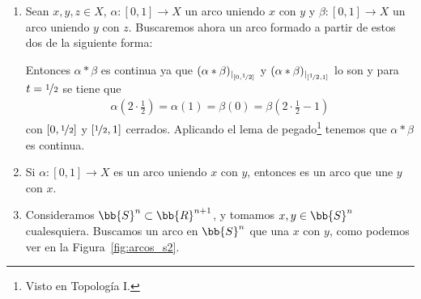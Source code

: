 \begin{ejemplo}
\begin{enumerate}
        \item Sean $x,y,z\in X$, $\alpha:[0,1]\to X$ un arco uniendo $x$ con $y$ y $\beta:[0,1]\to X$ un arco uniendo $y$ con $z$. Buscaremos ahora un arco formado a partir de estos dos de la siguiente forma:
        
        Entonces $\alpha\ast\beta$ es continua ya que $(\alpha\ast\beta)_{|_{[0,\nicefrac{1}{2}]}}$ y $(\alpha\ast\beta)_{|_{[\nicefrac{1}{2},1]}}$ lo son y para $t=\nicefrac{1}{2}$ se tiene que
        \begin{gather*}
            \alpha \left(2 \cdot \frac{1}{2}\right) = \alpha(1) = \beta(0) = \beta\left(2\cdot \frac{1}{2} -1\right)
        \end{gather*}
        con $\left[0, \nicefrac{1}{2}\right]$ y $\left[\nicefrac{1}{2}, 1\right]$ cerrados. Aplicando el lema de pegado\footnote{Visto en Topología I.} tenemos que $\alpha\ast \beta$ es continua.

        \item Si $\alpha:[0,1]\to X$ es un arco uniendo $x$ con $y$, entonces
        es un arco que une $y$ con $x$.

        \item \label{ej:arcos_s2}
        Consideramos $\bb{S}^n\subset \bb{R}^{n+1}$, y tomamos $x,y\in \bb{S}^n$ cualesquiera. Buscamos un arco en $\bb{S}^n$ que una $x$ con $y$, como podemos ver en la Figura~\ref{fig:arcos_s2}.
        \begin{figure}
            \centering
\end{figure}
\end{enumerate}
\end{ejemplo}
